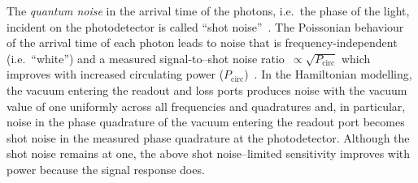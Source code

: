 
The \emph{quantum noise} in the arrival time of the photons, i.e.\ the phase of the light, incident on the photodetector is called ``shot noise''~\cite{PhysRevD.23.1693}. %
The Poissonian behaviour of the arrival time of each photon leads to noise that is frequency-independent (i.e.\ ``white'') and a measured signal-to--shot noise ratio~$\propto\sqrt{P_\text{circ}}$ which improves with increased circulating power ($P_\text{circ}$)~\cite{corbitt_2003}.
In the Hamiltonian modelling, the vacuum entering the readout and loss ports produces noise with the vacuum value of one uniformly across all frequencies and quadratures and, in particular, noise in the phase quadrature of the vacuum entering the readout port becomes shot noise in the measured phase quadrature at the photodetector. Although the shot noise remains at one, the above shot noise--limited sensitivity improves with power because the signal response does. 

